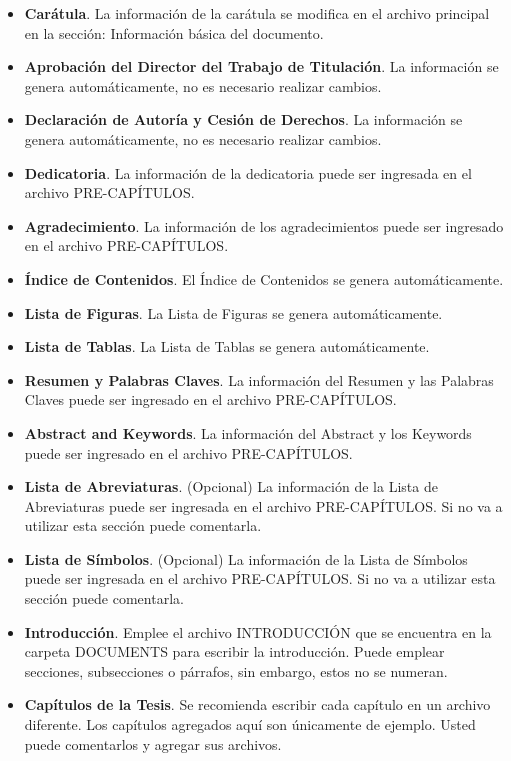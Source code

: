 \begin{itemize}
	\item \textbf{Carátula}. La información de la carátula se modifica en el archivo principal en la sección: Información básica del documento.  
	\item \textbf{Aprobación del Director del Trabajo de Titulación}. La información se genera automáticamente, no es necesario realizar cambios. 
	\item \textbf{Declaración de Autoría y Cesión de Derechos}. La información se genera automáticamente, no es necesario realizar cambios. 
	\item \textbf{Dedicatoria}. La información de la dedicatoria puede ser ingresada en el archivo PRE-CAPÍTULOS. 
	\item \textbf{Agradecimiento}. La información de los agradecimientos puede ser ingresado en el archivo PRE-CAPÍTULOS. 
	\item \textbf{Índice de Contenidos}. El Índice de Contenidos se genera automáticamente. 
	\item \textbf{Lista de Figuras}. La Lista de Figuras se genera automáticamente. 
	\item \textbf{Lista de Tablas}. La Lista de Tablas se genera automáticamente. 
	\item \textbf{Resumen y Palabras Claves}. La información del Resumen y las Palabras Claves puede ser ingresado en el archivo PRE-CAPÍTULOS.
	\item \textbf{Abstract and Keywords}. La información del Abstract y los Keywords puede ser ingresado en el archivo PRE-CAPÍTULOS.
	\item \textbf{Lista de Abreviaturas}. (Opcional) La información de la Lista de Abreviaturas puede ser ingresada en el archivo PRE-CAPÍTULOS. Si no va a utilizar esta sección puede comentarla. 
	\item \textbf{Lista de Símbolos}. (Opcional) La información de la Lista de Símbolos puede ser ingresada en el archivo PRE-CAPÍTULOS. Si no va a utilizar esta sección puede comentarla. 
	\item \textbf{Introducción}. Emplee el archivo INTRODUCCIÓN que se encuentra en la carpeta DOCUMENTS para escribir la introducción. Puede emplear secciones, subsecciones o párrafos, sin embargo, estos no se numeran. 
	\item \textbf{Capítulos de la Tesis}. Se recomienda escribir cada capítulo en un archivo diferente. Los capítulos agregados aquí son únicamente de ejemplo. Usted puede comentarlos y agregar sus archivos.  

\end{itemize}
